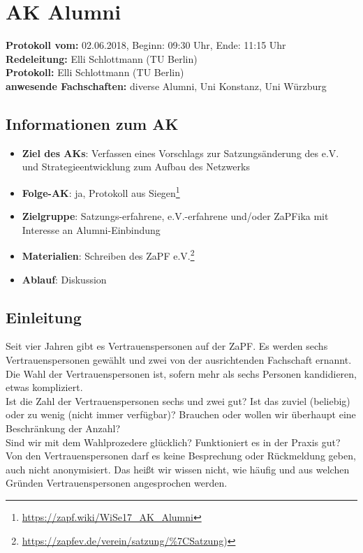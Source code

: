 
\section{AK Alumni}

  \textbf{Protokoll vom:} 02.06.2018,
  Beginn: 09:30 Uhr,
  Ende: 11:15 Uhr \\
  \textbf{Redeleitung:} Elli Schlottmann (TU Berlin) \\
  \textbf{Protokoll:} Elli Schlottmann (TU Berlin) \\
  \textbf{anwesende Fachschaften:} diverse Alumni, Uni Konstanz, Uni Würzburg

  \subsection*{Informationen zum AK}
    \begin{itemize}
      \item \textbf{Ziel des AKs}: Verfassen eines Vorschlags zur Satzungsänderung des e.V. und Strategieentwicklung zum Aufbau des Netzwerks
      \item \textbf{Folge-AK}: ja, Protokoll aus Siegen\footnote{\url{https://zapf.wiki/WiSe17_AK_Alumni}}
      \item \textbf{Zielgruppe}: Satzungs-erfahrene, e.V.-erfahrene und/oder ZaPFika mit Interesse an Alumni-Einbindung
      \item \textbf{Materialien}: Schreiben des ZaPF e.V.\footnote{\url{https://zapfev.de/verein/satzung/\%7CSatzung})}
      \item \textbf{Ablauf}: Diskussion
    \end{itemize}

  \subsection*{Einleitung}
Seit vier Jahren gibt es Vertrauenspersonen auf der ZaPF. Es werden sechs Vertrauenspersonen gewählt und zwei von der ausrichtenden Fachschaft ernannt. Die Wahl der Vertrauenspersonen ist, sofern mehr als sechs Personen kandidieren, etwas kompliziert. \\

    Ist die Zahl der Vertrauenspersonen sechs und zwei gut? Ist das zuviel (beliebig) oder zu wenig (nicht immer verfügbar)? Brauchen oder wollen wir überhaupt eine Beschränkung der Anzahl? \\
    Sind wir mit dem Wahlprozedere glücklich? Funktioniert es in der Praxis gut? \\
    Von den Vertrauenspersonen darf es keine Besprechung oder Rückmeldung geben, auch nicht anonymisiert. Das heißt wir wissen nicht, wie häufig und aus welchen Gründen Vertrauenspersonen angesprochen werden. \\

